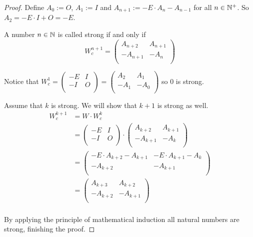 \begin{proof}
  Define $A_{0} := O$, $A_{1} := I$ and 
  $A_{n+1} := -E \cdot A_{n} - A_{n-1}$ for all $n\in\mathbb{N}^{+}$. So 
  $A_{2} = -E \cdot I + O = -E$. 

  A number $n\in\mathbb{N}$ is called strong if and only if
  \[
  W_{c}^{n+1}
  =
  \left(
  \begin{array}{cc}
     A_{n+2} &  A_{n+1} \\
    -A_{n+1} & -A_{n}   \\
  \end{array}
  \right)  
  \]

  Notice that
  $W_{c}^{1} = \left(\begin{smallmatrix} -E & I \\ -I & O \\\end{smallmatrix}\right) = \left(\begin{smallmatrix} A_{2} & A_{1} \\ -A_{1} & -A_{0} \\\end{smallmatrix}\right)$
  so $0$ is strong.

  Assume that $k$ is strong. We will show that $k+1$ is strong as well.
  \[
  \begin{aligned}
  W_{c}^{k+1} 
  & = W \cdot W_{c}^{k} \\
  & = 
  \left(
  \begin{array}{cc}
    -E & I \\
    -I & O \\
  \end{array}
  \right)
  \cdot
  \left(
  \begin{array}{cc}
     A_{k+2} &  A_{k+1} \\
    -A_{k+1} & -A_{k}   \\
  \end{array}
  \right) \\
  & = 
  \left(
  \begin{array}{cc}
    -E \cdot A_{k+2} - A_{k+1} & -E \cdot A_{k+1} - A_{k} \\
    -A_{k+2}                  & -A_{k+1}                 \\
  \end{array}
  \right) \\
  & =
  \left(
  \begin{array}{cc}
     A_{k+3} &  A_{k+2} \\
    -A_{k+2} & -A_{k+1} \\
  \end{array}
  \right) \\
  \end{aligned}
  \]

  By applying the principle of mathematical induction all natural
  numbers are strong, finishing the proof.
\end{proof}

